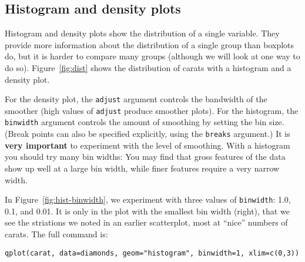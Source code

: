 \subsection{Histogram and density plots}\label{sub:density}

Histogram and density plots show the distribution of a single variable.  They provide more information about the distribution of a single group than boxplots do, but it is harder to compare many groups (although we will look at one way to do so).  Figure~\ref{fig:dist} shows the distribution of carats with a histogram and a density plot.

% 


For the density plot, the {\tt adjust} argument controls the bandwidth of the smoother (high values of {\tt adjust} produce smoother plots). For the histogram, the {\tt binwidth} argument controls the amount of smoothing by setting the bin size.  (Break points can also be specified explicitly, using the {\tt breaks} argument.) It is {\bf very important} to experiment with the level of smoothing.  With a histogram you should try many bin widths: You may find that gross features of the data show up well at a large bin width, while finer features require a very narrow width.

In Figure~\ref{fig:hist-binwidth}, we experiment with three values of {\tt binwidth}: 1.0, 0.1, and 0.01.  It is only in the plot with the smallest bin width (right), that we see the striations we noted in an earlier scatterplot, most at ``nice'' numbers of carats. The full command is:

{\tt qplot(carat, data=diamonds, geom="histogram", binwidth=1, xlim=c(0,3))}


%


